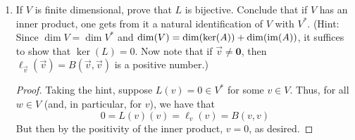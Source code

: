 \documentclass[../psets.tex]{subfiles}
\begin{document}
\begin{enumerate}[label={\textbf{1.2.\roman*.}}]
\begin{enumerate}
\begin{proof}
\begin{align*}
                &= B(v_1,w)+B(v_2,w)&
                    &= \lambda B(v,w)\\
                &= \ell_{v_1}(w)+\ell_{v_2}(w)&
                    &= \lambda\ell_v(w)\\
                &= L(v_1)(w)+L(v_2)(w)&
                    &= \lambda L(v)(w)\\
                &= [L(v_1)+L(v_2)](w)&
                    &= [\lambda L(v)](w)
            \end{align*}
            we know that the functions $L(v_1+v_2)$ and $L(v_1)+L(v_2)$ have the same action on every $w\in V$. Thus they are equal. A symmetric statement holds for $L(\lambda v)$ and $\lambda L(v)$.
        \end{proof}
        \item If $V$ is finite dimensional, prove that $L$ is bijective. Conclude that if $V$ has an inner product, one gets from it a natural identification of $V$ with $V^*$. (Hint: Since $\dim V=\dim V^*$ and $\dim(V)=\dim(\ker(A))+\dim(\operatorname{im}(A))$, it suffices to show that $\ker(L)=0$. Now note that if $\vec{v}\neq\bm{0}$, then $\ell_\vec{v}(\vec{v})=B(\vec{v},\vec{v})$ is a positive number.)
        \begin{proof}
            Taking the hint, suppose $L(v)=0\in V^*$ for some $v\in V$. Thus, for all $w\in V$ (and, in particular, for $v$), we have that
            \begin{equation*}
                0 = L(v)(v)
                = \ell_v(v)
                = B(v,v)
            \end{equation*}
            But then by the positivity of the inner product, $v=0$, as desired.
        \end{proof}
    \end{enumerate}
\end{enumerate}
\end{document}
